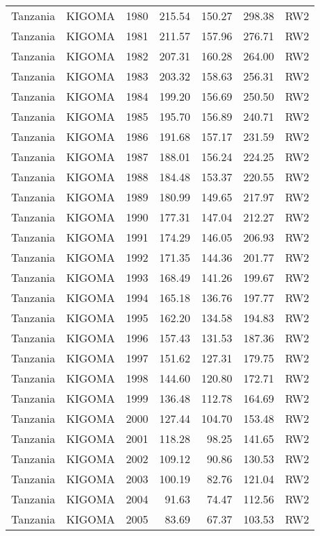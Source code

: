 \begin{longtable}{lllrrrl}
  Tanzania & KIGOMA & 1980 & 215.54 & 150.27 & 298.38 & RW2 \\ 
  Tanzania & KIGOMA & 1981 & 211.57 & 157.96 & 276.71 & RW2 \\ 
  Tanzania & KIGOMA & 1982 & 207.31 & 160.28 & 264.00 & RW2 \\ 
  Tanzania & KIGOMA & 1983 & 203.32 & 158.63 & 256.31 & RW2 \\ 
  Tanzania & KIGOMA & 1984 & 199.20 & 156.69 & 250.50 & RW2 \\ 
  Tanzania & KIGOMA & 1985 & 195.70 & 156.89 & 240.71 & RW2 \\ 
  Tanzania & KIGOMA & 1986 & 191.68 & 157.17 & 231.59 & RW2 \\ 
  Tanzania & KIGOMA & 1987 & 188.01 & 156.24 & 224.25 & RW2 \\ 
  Tanzania & KIGOMA & 1988 & 184.48 & 153.37 & 220.55 & RW2 \\ 
  Tanzania & KIGOMA & 1989 & 180.99 & 149.65 & 217.97 & RW2 \\ 
  Tanzania & KIGOMA & 1990 & 177.31 & 147.04 & 212.27 & RW2 \\ 
  Tanzania & KIGOMA & 1991 & 174.29 & 146.05 & 206.93 & RW2 \\ 
  Tanzania & KIGOMA & 1992 & 171.35 & 144.36 & 201.77 & RW2 \\ 
  Tanzania & KIGOMA & 1993 & 168.49 & 141.26 & 199.67 & RW2 \\ 
  Tanzania & KIGOMA & 1994 & 165.18 & 136.76 & 197.77 & RW2 \\ 
  Tanzania & KIGOMA & 1995 & 162.20 & 134.58 & 194.83 & RW2 \\ 
  Tanzania & KIGOMA & 1996 & 157.43 & 131.53 & 187.36 & RW2 \\ 
  Tanzania & KIGOMA & 1997 & 151.62 & 127.31 & 179.75 & RW2 \\ 
  Tanzania & KIGOMA & 1998 & 144.60 & 120.80 & 172.71 & RW2 \\ 
  Tanzania & KIGOMA & 1999 & 136.48 & 112.78 & 164.69 & RW2 \\ 
  Tanzania & KIGOMA & 2000 & 127.44 & 104.70 & 153.48 & RW2 \\ 
  Tanzania & KIGOMA & 2001 & 118.28 & 98.25 & 141.65 & RW2 \\ 
  Tanzania & KIGOMA & 2002 & 109.12 & 90.86 & 130.53 & RW2 \\ 
  Tanzania & KIGOMA & 2003 & 100.19 & 82.76 & 121.04 & RW2 \\ 
  Tanzania & KIGOMA & 2004 & 91.63 & 74.47 & 112.56 & RW2 \\ 
  Tanzania & KIGOMA & 2005 & 83.69 & 67.37 & 103.53 & RW2 \\ 

\end{longtable}
